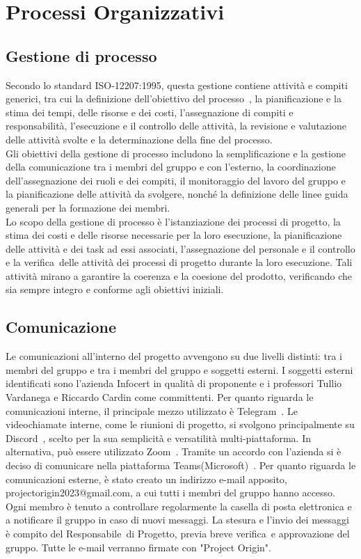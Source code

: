 \section{Processi Organizzativi}

\subsection{Gestione di processo}
Secondo lo standard ISO-12207:1995, questa gestione contiene attività e compiti generici, tra cui la definizione dell'obiettivo del processo\glo\ , la pianificazione e la stima 
dei tempi, delle risorse e dei costi, l'assegnazione di compiti e responsabilità, l'esecuzione e il controllo delle attività, la revisione e valutazione delle attività svolte 
e la determinazione della fine del processo. \\
Gli obiettivi della gestione di processo includono la semplificazione e la gestione della comunicazione tra i membri del gruppo e con l'esterno, la coordinazione 
dell'assegnazione dei ruoli e dei compiti, il monitoraggio del lavoro del gruppo e la pianificazione delle attività da svolgere, nonché la definizione delle linee guida 
generali per la formazione dei membri. \\
Lo scopo della gestione di processo è l'istanziazione dei processi di progetto, la stima dei costi e delle risorse necessarie per la loro esecuzione, la pianificazione 
delle attività e dei task ad essi associati, l'assegnazione del personale e il controllo e la verifica\glo\ delle attività dei processi di progetto durante la loro esecuzione. 
Tali attività mirano a garantire la coerenza e la coesione del prodotto, verificando che sia sempre integro e conforme agli obiettivi iniziali.

\subsection{Comunicazione}
Le comunicazioni all'interno del progetto avvengono su due livelli distinti: tra i membri del gruppo e tra i membri del gruppo e soggetti esterni. I soggetti esterni 
identificati sono l'azienda Infocert in qualità di proponente e i professori Tullio Vardanega e Riccardo Cardin come committenti. Per quanto riguarda le comunicazioni interne, 
il principale mezzo utilizzato è Telegram\glo\ . Le videochiamate interne, come le riunioni di progetto, si svolgono principalmente su Discord\glo\ , scelto per la sua semplicità e 
versatilità multi-piattaforma. In alternativa, può essere utilizzato Zoom\glo\ . Tramite un accordo con l'azienda si è deciso di comunicare nella piattaforma Teams(Microsoft)\glo\ . Per quanto riguarda le comunicazioni esterne, è stato creato un indirizzo e-mail 
apposito, projectorigin2023@gmail.com, a cui tutti i membri del gruppo hanno accesso. Ogni membro è tenuto a controllare regolarmente la casella di posta elettronica e a 
notificare il gruppo in caso di nuovi messaggi. La stesura e l'invio dei messaggi è compito del Responsabile\glo\ di Progetto, previa breve verifica\glo\ e approvazione del gruppo. 
Tutte le e-mail verranno firmate con "Project Origin". 

